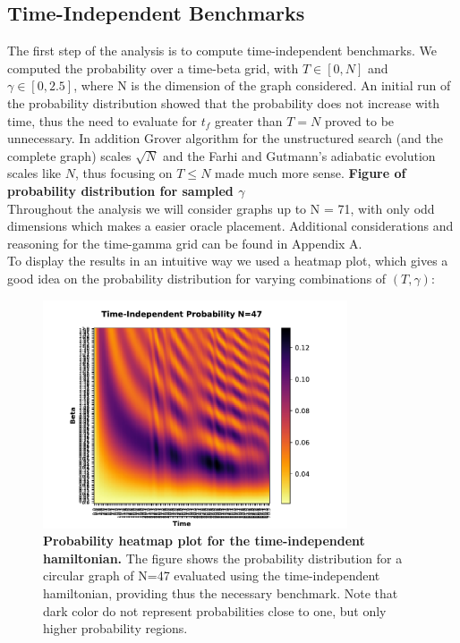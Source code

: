     \subsection{Time-Independent Benchmarks}
        The first step of the analysis is to compute time-independent benchmarks. We computed the probability over a time-beta grid, with $T\in[0,N]$ and $\gamma\in[0,2.5]$, where N is the dimension of the graph considered. An initial run of the probability distribution showed that the probability does not increase with time, thus the need to evaluate for $t_f$ greater than $T=N$ proved to be unnecessary. In addition Grover algorithm for the unstructured search (and the complete graph) scales $\sqrt{N}$ and the Farhi and Gutmann's adiabatic evolution scales like $N$, thus focusing on $T \leq N$ made much more sense. \textbf{Figure of probability distribution for sampled $\gamma$} \\
        Throughout the analysis we will consider graphs up to N = 71, with only odd dimensions which makes a easier oracle placement. Additional considerations and reasoning for the time-gamma grid can be found in Appendix A. \\


        To display the results in an intuitive way we used a heatmap plot, which gives a good idea on the probability distribution for varying combinations of $(T,\gamma)$:

          \begin{figure}[ht]
            \centering
            \includegraphics[width=9cm]{./figures/time_independent_benchmark_47}%
            \caption[Probability heatmap plot for the time-independent hamiltonian, N=47]{\textbf{Probability heatmap plot for the time-independent hamiltonian.} The figure shows the probability distribution for a circular graph of N=47 evaluated using the time-independent hamiltonian, providing thus the necessary benchmark. Note that dark color do not represent probabilities close to one, but only higher probability regions.}
          \end{figure}

